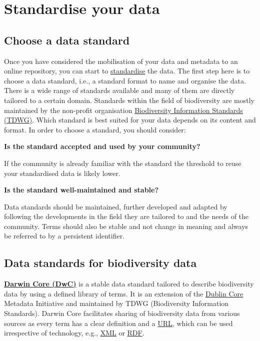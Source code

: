 \documentclass[
  oneside]{book}
\begin{document}
\chapter{Standardise your data}\label{standardise-your-data}

\section{Choose a data standard}\label{choose-a-data-standard}

Once you have considered the mobilisation of your data and metadata to an online repository, you can start to \hyperref[standardise]{standardise} the data. The first step here is to choose a data standard, i.e., a standard format to name and organise the data. There is a wide range of standards available and many of them are directly tailored to a certain domain. Standards within the field of biodiversity are mostly maintained by the non-profit organisation \href{https://www.tdwg.org/}{Biodiversity Information Standards (TDWG)}. Which standard is best suited for your data depends on its content and format. In order to choose a standard, you should consider:

\textbf{Is the standard accepted and used by your community?}

If the community is already familiar with the standard the threshold to reuse your standardised data is likely lower.

\textbf{Is the standard well-maintained and stable?}

Data standards should be maintained, further developed and adapted by following the developments in the field they are tailored to and the needs of the community. Terms should also be stable and not change in meaning and always be referred to by a persistent identifier.

\section{Data standards for biodiversity data}\label{data-standards-for-biodiversity-data}

\href{https://dwc.tdwg.org/}{\textbf{Darwin Core (DwC)}} is a stable data standard tailored to describe biodiversity data by using a defined library of terms. It is an extension of the \hyperref[dublincore]{Dublin Core} Metadata Initiative and maintained by TDWG (Biodiversity Information Standards). Darwin Core facilitates sharing of biodiversity data from various sources as every term has a clear definition and a \hyperref[URI]{URL}, which can be used irrespective of technology, e.g., \hyperref[XML]{XML} or \hyperref[RDF]{RDF}.
\end{document}
